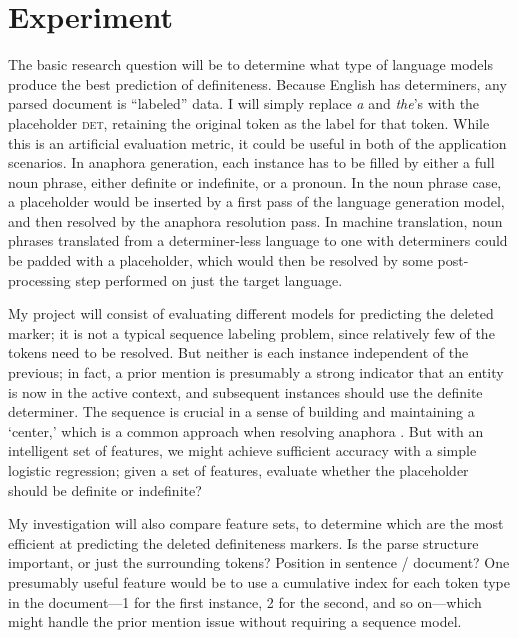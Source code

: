 \documentclass[11pt]{article}
\begin{document}


















\section{Experiment}
The basic research question will be to determine what type of language models produce the best prediction of definiteness. Because English has determiners, any parsed document is ``labeled'' data. I will simply replace \emph{a} and \emph{the}'s with the placeholder \guillemotleft\textsc{det}\guillemotright, retaining the original token as the label for that token. While this is an artificial evaluation metric, it could be useful in both of the application scenarios. In anaphora generation, each instance has to be filled by either a full noun phrase, either definite or indefinite, or a pronoun. In the noun phrase case, a placeholder would be inserted by a first pass of the language generation model, and then resolved by the anaphora resolution pass. In machine translation, noun phrases translated from a determiner-less language to one with determiners could be padded with a placeholder, which would then be resolved by some post-processing step performed on just the target language.

My project will consist of evaluating different models for predicting the deleted marker; it is not a typical sequence labeling problem, since relatively few of the tokens need to be resolved. But neither is each instance independent of the previous; in fact, a prior mention is presumably a strong indicator that an entity is now in the active context, and subsequent instances should use the definite determiner. The sequence is crucial in a sense of building and maintaining a `center,' which is a common approach when resolving anaphora \citep{grosz:1995, beaver:2000}.
But with an intelligent set of features, we might achieve sufficient accuracy with a simple logistic regression; given a set of features, evaluate whether the placeholder should be definite or indefinite?

My investigation will also compare feature sets, to determine which are the most efficient at predicting the deleted definiteness markers. Is the parse structure important, or just the surrounding tokens? Position in sentence / document? One presumably useful feature would be to use a cumulative index for each token type in the document---1 for the first instance, 2 for the second, and so on---which might handle the prior mention issue without requiring a sequence model.
\end{document}
